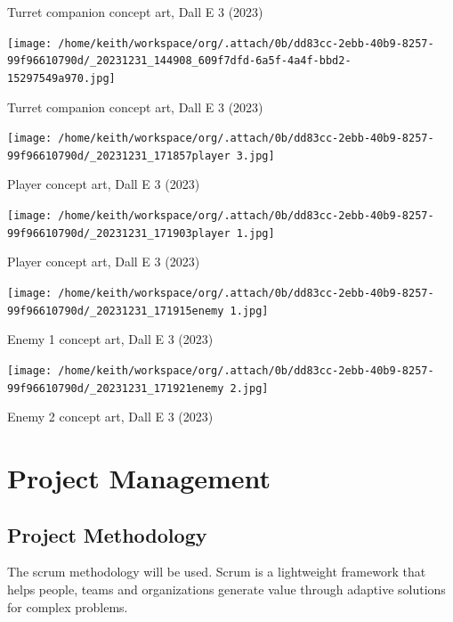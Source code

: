 \documentclass{article}
\begin{document}
Turret companion concept art, Dall E 3 (2023)



\begin{center}
\texttt{[image: /home/keith/workspace/org/.attach/0b/dd83cc-2ebb-40b9-8257-99f96610790d/\_20231231\_144908\_609f7dfd-6a5f-4a4f-bbd2-15297549a970.jpg]}
\end{center}

Turret companion concept art, Dall E 3 (2023)



\begin{center}
\texttt{[image: /home/keith/workspace/org/.attach/0b/dd83cc-2ebb-40b9-8257-99f96610790d/\_20231231\_171857player 3.jpg]}
\end{center}


Player concept art, Dall E 3 (2023)



\begin{center}
\texttt{[image: /home/keith/workspace/org/.attach/0b/dd83cc-2ebb-40b9-8257-99f96610790d/\_20231231\_171903player 1.jpg]}
\end{center}


Player concept art, Dall E 3 (2023)



\begin{center}
\texttt{[image: /home/keith/workspace/org/.attach/0b/dd83cc-2ebb-40b9-8257-99f96610790d/\_20231231\_171915enemy 1.jpg]}
\end{center}


Enemy 1 concept art, Dall E 3 (2023)



\begin{center}
\texttt{[image: /home/keith/workspace/org/.attach/0b/dd83cc-2ebb-40b9-8257-99f96610790d/\_20231231\_171921enemy 2.jpg]}
\end{center}


Enemy 2 concept art, Dall E 3 (2023)
\section{Project Management}
\label{sec:orga4dab4b}
\subsection{Project Methodology}
\label{sec:org271936c}
The scrum methodology will be used.
Scrum is a lightweight framework that helps people, teams and organizations generate value through adaptive solutions for complex problems.
\end{document}
